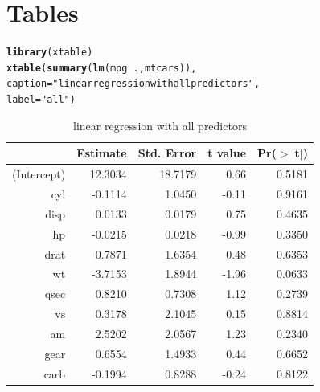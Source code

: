 \documentclass[a4paper, 11pt]{article}\usepackage[]{graphicx}\usepackage[]{color}
\makeatletter
\newcommand{\hlstr}[1]{\textcolor[rgb]{0.192,0.494,0.8}{#1}}%
\newcommand{\hlopt}[1]{\textcolor[rgb]{0,0,0}{#1}}%
\newcommand{\hlstd}[1]{\textcolor[rgb]{0.345,0.345,0.345}{#1}}%
\newcommand{\hlkwc}[1]{\textcolor[rgb]{0.333,0.667,0.333}{#1}}%
\newcommand{\hlkwd}[1]{\textcolor[rgb]{0.737,0.353,0.396}{\textbf{#1}}}%
\newenvironment{kframe}{%
 \def\at@end@of@kframe{}%
 \ifinner\ifhmode%
  \def\at@end@of@kframe{\end{minipage}}%
  \begin{minipage}{\columnwidth}%
 \fi\fi%
 \def\FrameCommand##1{\hskip\@totalleftmargin \hskip-\fboxsep
 \colorbox{shadecolor}{##1}\hskip-\fboxsep
     \hskip-\linewidth \hskip-\@totalleftmargin \hskip\columnwidth}%
 \MakeFramed {\advance\hsize-\width
   \@totalleftmargin\z@ \linewidth\hsize
   \@setminipage}}%
 {\par\unskip\endMakeFramed%
 \at@end@of@kframe}
\makeatother
\begin{document}
\newpage
\appendix
\section{Tables}
\begin{kframe}
\begin{alltt}
\hlkwd{library}\hlstd{(xtable)}
\hlkwd{xtable}\hlstd{(}\hlkwd{summary}\hlstd{(}\hlkwd{lm}\hlstd{(mpg}\hlopt{~}\hlstd{.,mtcars)),}
       \hlkwc{caption}\hlstd{=}\hlstr{"linear regression with all predictors"}\hlstd{,}
       \hlkwc{label}\hlstd{=}\hlstr{"all"}\hlstd{)}
\end{alltt}
\end{kframe}%
\begin{table}[ht]
\centering
\begin{tabular}{rrrrr}
  \hline
 & Estimate & Std. Error & t value & Pr($>$$|$t$|$) \\ 
  \hline
(Intercept) & 12.3034 & 18.7179 & 0.66 & 0.5181 \\ 
  cyl & -0.1114 & 1.0450 & -0.11 & 0.9161 \\ 
  disp & 0.0133 & 0.0179 & 0.75 & 0.4635 \\ 
  hp & -0.0215 & 0.0218 & -0.99 & 0.3350 \\ 
  drat & 0.7871 & 1.6354 & 0.48 & 0.6353 \\ 
  wt & -3.7153 & 1.8944 & -1.96 & 0.0633 \\ 
  qsec & 0.8210 & 0.7308 & 1.12 & 0.2739 \\ 
  vs & 0.3178 & 2.1045 & 0.15 & 0.8814 \\ 
  am & 2.5202 & 2.0567 & 1.23 & 0.2340 \\ 
  gear & 0.6554 & 1.4933 & 0.44 & 0.6652 \\ 
  carb & -0.1994 & 0.8288 & -0.24 & 0.8122 \\ 
   \hline
\end{tabular}
\caption{linear regression with all predictors} 
\label{all}
\end{table}
\end{document}
